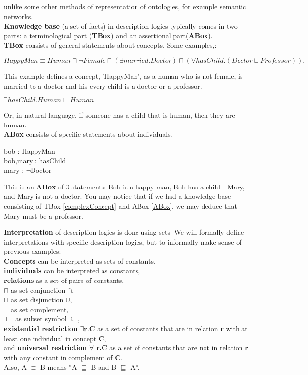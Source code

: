 unlike some other methods of representation of ontologies, for example semantic networks. 
\\ \textbf{Knowledge base} (a set of facts) in description logics typically comes in two parts: a terminological part (\textbf{TBox}) and an assertional part(\textbf{ABox}).\\
\textbf{TBox} consists of general statements about concepts. Some examples,: 
\begin{myex}
\label{complexConcept}
 \cite{handbook2} 
$HappyMan  \equiv   Human  \sqcap  \neg  Female  \sqcap  (\exists  married.Doctor) \sqcap
(\forall  hasChild.(Doctor  \sqcup  Professor)).$
\end{myex}
This example defines a concept, 'HappyMan',  as a human who is not female, is married to a doctor and his every child is a doctor or a professor.
\begin{myex} \cite{handbook2}
$\exists hasChild.Human \sqsubseteq Human$
\end{myex}
Or, in natural language, if someone has a child that is human, then they are human. \\
\textbf{ABox} consists of specific statements about individuals. 
\begin{myex} 
\label{ABox}
\cite{handbook2}
bob : HappyMan \\
bob,mary : hasChild\\
mary : $\neg$Doctor
\end{myex}
This is an \textbf{ABox} of 3 statements: Bob is a happy man, Bob has a child - Mary, and Mary is not a doctor.
You may notice that if we had a knowledge base consisting of TBox \ref{complexConcept} and ABox \ref{ABox}, we may deduce  that Mary must be a professor.

\textbf{Interpretation} of description logics is done using sets. We will formally define interpretations with specific description logics, but to informally make sense of previous examples: \\
\textbf{Concepts} can be interpreted as sets of constants,\\ \textbf{individuals} can be interpreted as constants,\\ \textbf{relations} as a set of pairs of constants,\\ \textbf{$\sqcap$} as set conjunction $\cap$, \\ \textbf{$\sqcup$} as set disjunction $\cup$,\\ $\neg$ as set complement,\\ $\sqsubseteq$ as subset symbol $\subseteq$,\\ \textbf{existential restriction} $\exists \textbf{r.C}$ as a set of constants that are in relation \textbf{r} with at least one individual in concept \textbf{C},\\ and \textbf{universal restriction} $\forall$ \textbf{r.C} as a set of constants that are not in relation \textbf{r} with any constant in complement of \textbf{C}. \\Also, A $\equiv$ B means ''A $\sqsubseteq$ B and B $\sqsubseteq$ A''.  


